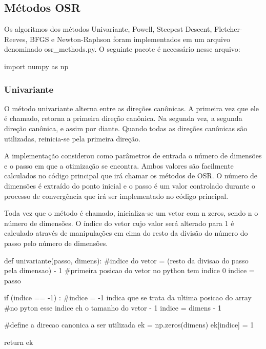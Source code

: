 \documentclass[10pt, a4paper]{article}
\begin{document}
\subsection{Métodos OSR}

Os algoritmos dos métodos Univariante, Powell, Steepest Descent, Fletcher-Reeves, BFGS e Newton-Raphson foram implementados em um arquivo denominado osr\_methods.py. O seguinte pacote é necessário nesse arquivo: 
\begin{python}
  import numpy as np
\end{python}

\subsubsection{Univariante}

O método univariante alterna entre as direções canônicas. A primeira vez que ele é chamado, retorna a primeira direção canônica. Na segunda vez, a segunda direção canônica, e assim por diante.
Quando todas as direções canônicas são utilizadas, reinicia-se pela primeira direção.

A implementação considerou como parâmetros de entrada o número de dimensões  e o passo em que a otimização se encontra. Ambos valores são facilmente calculados no código principal que irá chamar 
os métodos de OSR. O número de dimensões é extraído do ponto inicial e o passo é um valor controlado durante o processo de convergência que irá ser implementado no código principal.

Toda vez que o método é chamado, inicializa-se um vetor com n zeros, sendo n o número de dimensões. O índice do vetor cujo valor será alterado para 1 é calculado 
através de manipulações em cima do resto da divisão do número do passo pelo número de dimensões.

\begin{python}
  def univariante(passo, dimens):
    #indice do vetor = (resto da divisao do passo pela dimensao) - 1
    #primeira posicao do vetor no python tem indice 0
    indice = passo%
    
    if (indice == -1) :
        #indice = -1 indica que se trata da ultima posicao do array
        #no pyton esse indice eh o tamanho do vetor - 1
        indice = dimens - 1
        
    #define a direcao canonica a ser utilizada
    ek = np.zeros(dimens)
    ek[indice] = 1
    
    return ek
\end{python}
\end{document}
